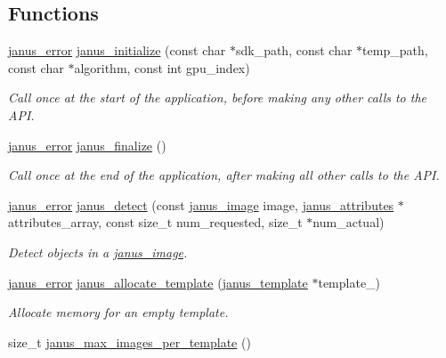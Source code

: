\subsection*{Functions}
\begin{DoxyCompactItemize}
\item 
\hyperlink{group__janus_ga1b275e4dade484951b366f785597b8f6}{janus\+\_\+error} \hyperlink{group__janus_gabeb9d27d8fbd3b6d00ae05f79dc4780c}{janus\+\_\+initialize} (const char $\ast$sdk\+\_\+path, const char $\ast$temp\+\_\+path, const char $\ast$algorithm, const int gpu\+\_\+index)
\begin{DoxyCompactList}\small\item\em Call once at the start of the application, before making any other calls to the A\+P\+I. \end{DoxyCompactList}\item 
\hyperlink{group__janus_ga1b275e4dade484951b366f785597b8f6}{janus\+\_\+error} \hyperlink{group__janus_gaca1ad3c66d178b28550980179f24f7d3}{janus\+\_\+finalize} ()
\begin{DoxyCompactList}\small\item\em Call once at the end of the application, after making all other calls to the A\+P\+I. \end{DoxyCompactList}\item 
\hyperlink{group__janus_ga1b275e4dade484951b366f785597b8f6}{janus\+\_\+error} \hyperlink{group__janus_ga1995d0f4c4d5442a3457e82b340fc616}{janus\+\_\+detect} (const \hyperlink{structjanus__image}{janus\+\_\+image} image, \hyperlink{structjanus__attributes}{janus\+\_\+attributes} $\ast$attributes\+\_\+array, const size\+\_\+t num\+\_\+requested, size\+\_\+t $\ast$num\+\_\+actual)
\begin{DoxyCompactList}\small\item\em Detect objects in a \hyperlink{structjanus__image}{janus\+\_\+image}. \end{DoxyCompactList}\item 
\hyperlink{group__janus_ga1b275e4dade484951b366f785597b8f6}{janus\+\_\+error} \hyperlink{group__janus_ga8619857e68a2dacee603313b042f2fcc}{janus\+\_\+allocate\+\_\+template} (\hyperlink{group__janus_gaabac6b357615bbd03a082c714190e2d0}{janus\+\_\+template} $\ast$template\+\_\+)
\begin{DoxyCompactList}\small\item\em Allocate memory for an empty template. \end{DoxyCompactList}\item 
size\+\_\+t \hyperlink{group__janus_gaa3584f363765de3576abb5ed42669d5e}{janus\+\_\+max\+\_\+images\+\_\+per\+\_\+template} ()

\end{DoxyCompactItemize}

